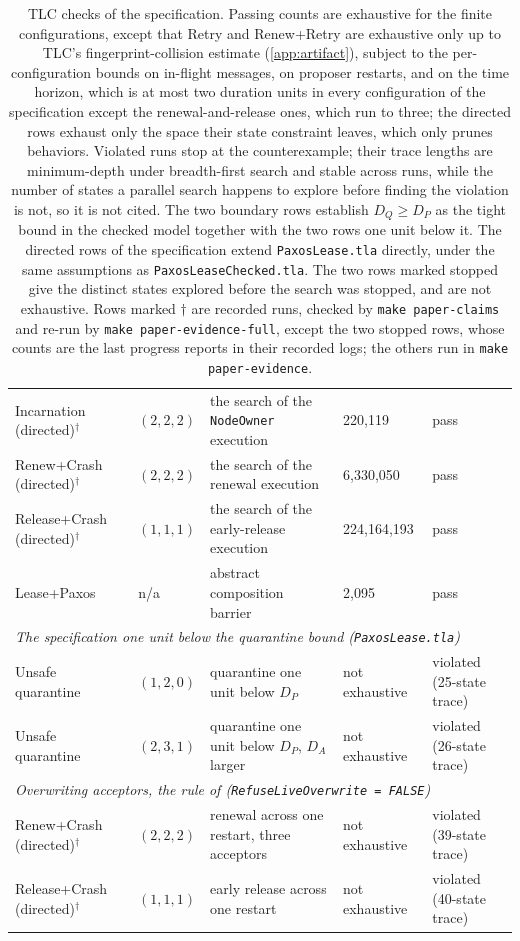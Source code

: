 \documentclass[final,5p,times,twocolumn,number]{elsarticle}
\newcommand{\code}[1]{\texttt{#1}}
\begin{document}
\begin{table}[!t]
\begin{tabular*}{\textwidth}{@{\extracolsep{\fill}}lllll}
Incarnation (directed)$^\dagger$ & $(2,2,2)$ & the search of the \code{NodeOwner} execution & 220,119 & pass \\
Renew+Crash (directed)$^\dagger$ & $(2,2,2)$ & the search of the renewal execution & 6,330,050 & pass \\
Release+Crash (directed)$^\dagger$ & $(1,1,1)$ & the search of the early-release execution & 224,164,193 & pass \\
Lease+Paxos & n/a & abstract composition barrier & 2,095 & pass \\
\midrule
\multicolumn{5}{l}{\emph{The specification one unit below the quarantine bound (\code{PaxosLease.tla})}} \\
Unsafe quarantine & $(1,2,0)$ & quarantine one unit below $D_P$ & not exhaustive & violated (25-state trace) \\
Unsafe quarantine & $(2,3,1)$ & quarantine one unit below $D_P$, $D_A$ larger & not exhaustive & violated (26-state trace) \\
\midrule
\multicolumn{5}{l}{\emph{Overwriting acceptors, the rule of \cite{ref1} (\code{RefuseLiveOverwrite = FALSE})}} \\
Renew+Crash (directed)$^\dagger$ & $(2,2,2)$ & renewal across one restart, three acceptors & not exhaustive & violated (39-state trace) \\
Release+Crash (directed)$^\dagger$ & $(1,1,1)$ & early release across one restart & not exhaustive & violated (40-state trace) \\
\bottomrule
\end{tabular*}
\caption{\label{tab:configs}TLC checks of the specification.  Passing counts are exhaustive for the finite configurations, except that Retry and Renew+Retry are exhaustive only up to TLC's fingerprint-collision estimate (\ref{app:artifact}), subject to the per-configuration bounds on in-flight messages, on proposer restarts, and on the time horizon, which is at most two duration units in every configuration of the specification except the renewal-and-release ones, which run to three; the directed rows exhaust only the space their state constraint leaves, which only prunes behaviors.  Violated runs stop at the counterexample; their trace lengths are minimum-depth under breadth-first search and stable across runs, while the number of states a parallel search happens to explore before finding the violation is not, so it is not cited.  The two boundary rows establish $D_Q \geq D_P$ as the tight bound in the checked model together with the two rows one unit below it.  The directed rows of the specification extend \code{PaxosLease.tla} directly, under the same assumptions as \code{PaxosLeaseChecked.tla}.  The two rows marked stopped give the distinct states explored before the search was stopped, and are not exhaustive.  Rows marked $\dagger$ are recorded runs, checked by \code{make paper-claims} and re-run by \code{make paper-evidence-full}, except the two stopped rows, whose counts are the last progress reports in their recorded logs; the others run in \code{make paper-evidence}.}
\end{table}
\end{document}
